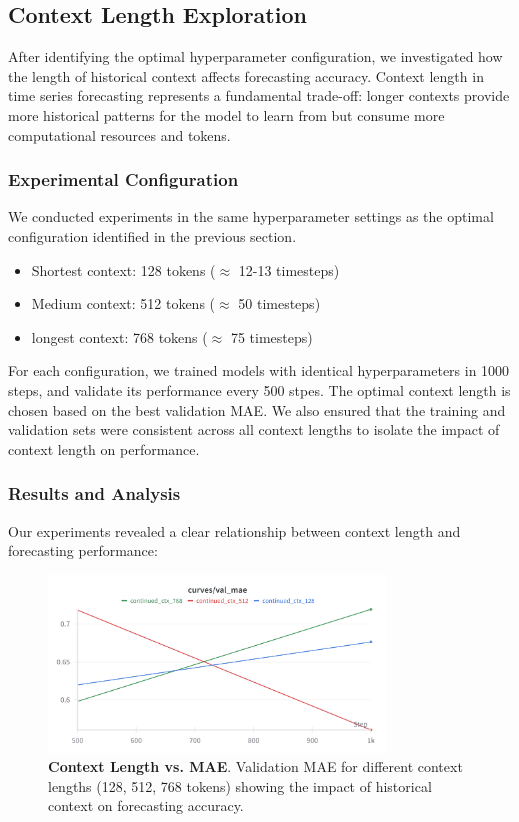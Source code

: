 \documentclass{article}
\begin{document}
\subsection*{Context Length Exploration}
After identifying the optimal hyperparameter configuration, we investigated how the length of historical context affects forecasting accuracy. Context length in time series forecasting represents a fundamental trade-off: longer contexts provide more historical patterns for the model to learn from but consume more computational resources and tokens.
\subsubsection*{Experimental Configuration}
We conducted experiments in the same hyperparameter settings as the optimal configuration identified in the previous section.
\begin{itemize}
    \item Shortest context: 128 tokens ($\approx$ 12-13 timesteps)
    \item Medium context: 512 tokens ($\approx$ 50 timesteps)
    \item longest context: 768 tokens ($\approx$ 75 timesteps)
\end{itemize}
For each configuration, we trained models with identical hyperparameters in 1000 steps, and validate its performance every 500 stpes. The optimal context length is chosen based on the best validation MAE. We also ensured that the training and validation sets were consistent across all context lengths to isolate the impact of context length on performance.

\subsubsection*{Results and Analysis}
Our experiments revealed a clear relationship between context length and forecasting performance:
\begin{figure} [H]
    \centering
    \includegraphics[width=0.8\textwidth]{context_length}
    \caption{\textbf{Context Length vs. MAE}. Validation MAE for different context lengths (128, 512, 768 tokens) showing the impact of historical context on forecasting accuracy.}
    \label{fig:context_length}
\end{figure}
\end{document}
